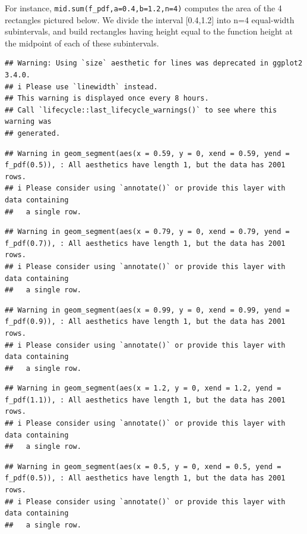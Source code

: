 \documentclass[
]{book}
\theoremstyle{definition}
\theoremstyle{definition}
\theoremstyle{definition}
\theoremstyle{definition}
\theoremstyle{remark}
\begin{document}
For instance, \texttt{mid.sum(f\_pdf,a=0.4,b=1.2,n=4)} computes the area of the 4 rectangles pictured below. We divide the interval {[}0.4,1.2{]} into n=4 equal-width subintervals, and build rectangles having height equal to the function height at the midpoint of each of these subintervals.

\begin{verbatim}
## Warning: Using `size` aesthetic for lines was deprecated in ggplot2 3.4.0.
## i Please use `linewidth` instead.
## This warning is displayed once every 8 hours.
## Call `lifecycle::last_lifecycle_warnings()` to see where this warning was
## generated.
\end{verbatim}

\begin{verbatim}
## Warning in geom_segment(aes(x = 0.59, y = 0, xend = 0.59, yend = f_pdf(0.5)), : All aesthetics have length 1, but the data has 2001 rows.
## i Please consider using `annotate()` or provide this layer with data containing
##   a single row.
\end{verbatim}

\begin{verbatim}
## Warning in geom_segment(aes(x = 0.79, y = 0, xend = 0.79, yend = f_pdf(0.7)), : All aesthetics have length 1, but the data has 2001 rows.
## i Please consider using `annotate()` or provide this layer with data containing
##   a single row.
\end{verbatim}

\begin{verbatim}
## Warning in geom_segment(aes(x = 0.99, y = 0, xend = 0.99, yend = f_pdf(0.9)), : All aesthetics have length 1, but the data has 2001 rows.
## i Please consider using `annotate()` or provide this layer with data containing
##   a single row.
\end{verbatim}

\begin{verbatim}
## Warning in geom_segment(aes(x = 1.2, y = 0, xend = 1.2, yend = f_pdf(1.1)), : All aesthetics have length 1, but the data has 2001 rows.
## i Please consider using `annotate()` or provide this layer with data containing
##   a single row.
\end{verbatim}

\begin{verbatim}
## Warning in geom_segment(aes(x = 0.5, y = 0, xend = 0.5, yend = f_pdf(0.5)), : All aesthetics have length 1, but the data has 2001 rows.
## i Please consider using `annotate()` or provide this layer with data containing
##   a single row.
\end{verbatim}
\end{document}
